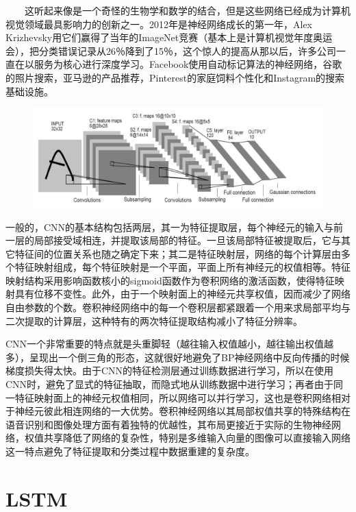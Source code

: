 \documentclass{progbookcn}
\begin{document}
　　这听起来像是一个奇怪的生物学和数学的结合，但是这些网络已经成为计算机视觉领域最具影响力的创新之一。2012年是神经网络成长的第一年，Alex Krizhevsky用它们赢得了当年的ImageNet竞赛（基本上是计算机视觉年度奥运会），把分类错误记录从26％降到了15％，这个惊人的提高从那以后，许多公司一直在以服务为核心进行深度学习。Facebook使用自动标记算法的神经网络，谷歌的照片搜索，亚马逊的产品推荐，Pinterest的家庭饲料个性化和Instagram的搜索基础设施。

\begin{figure}[H]
  \centering
  \includegraphics[scale = 0.6]{cnn_show.jpeg}
\end{figure}

一般的，CNN的基本结构包括两层，其一为特征提取层，每个神经元的输入与前一层的局部接受域相连，并提取该局部的特征。一旦该局部特征被提取后，它与其它特征间的位置关系也随之确定下来；其二是特征映射层，网络的每个计算层由多个特征映射组成，每个特征映射是一个平面，平面上所有神经元的权值相等。特征映射结构采用影响函数核小的sigmoid函数作为卷积网络的激活函数，使得特征映射具有位移不变性。此外，由于一个映射面上的神经元共享权值，因而减少了网络自由参数的个数。卷积神经网络中的每一个卷积层都紧跟着一个用来求局部平均与二次提取的计算层，这种特有的两次特征提取结构减小了特征分辨率。

CNN一个非常重要的特点就是头重脚轻（越往输入权值越小，越往输出权值越多），呈现出一个倒三角的形态，这就很好地避免了BP神经网络中反向传播的时候梯度损失得太快。由于CNN的特征检测层通过训练数据进行学习，所以在使用CNN时，避免了显式的特征抽取，而隐式地从训练数据中进行学习；再者由于同一特征映射面上的神经元权值相同，所以网络可以并行学习，这也是卷积网络相对于神经元彼此相连网络的一大优势。卷积神经网络以其局部权值共享的特殊结构在语音识别和图像处理方面有着独特的优越性，其布局更接近于实际的生物神经网络，权值共享降低了网络的复杂性，特别是多维输入向量的图像可以直接输入网络这一特点避免了特征提取和分类过程中数据重建的复杂度。


\section{LSTM}
\end{document}

